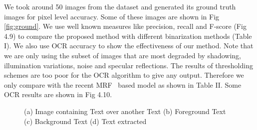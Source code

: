 We took around 50
images from the dataset and generated its ground truth images for pixel level accuracy.
Some of these images are shown in Fig \ref{fig:ground}.
We use well known measures like precision, recall and F-score (Fig 4.9) %
to compare the proposed method with different binarization methods (Table I).
We also use OCR accuracy to show the effectiveness of our method. Note that we are only
using the subset of images that are most degraded by shadowing, illumination variations,
noise and specular reflections. The results of thresholding schemes are too poor for the
OCR algorithm to give any output. Therefore we only compare with the recent MRF~\cite{A16}
based model as shown in Table II. Some OCR results are shown in Fig 4.10. %

\begin{figure}[t]
\centering
{}
\label{fig:text}
\caption
{(a) Image containing Text over another Text (b) Foreground Text (c) Background Text (d)
Text extracted}
\end{figure}
